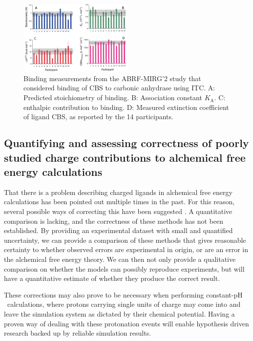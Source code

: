 \documentclass[10pt,final]{article}
\newcommand{\pH}{$\mathrm{pH}$\ }
\begin{document}
\begin{figure}[H]
	\centering
	\includegraphics[width=0.5\textwidth]{figures/cbs_ca_II.PNG}
	\caption{Binding measurements from the ABRF-MIRG'2 study that considered binding of CBS to carbonic anhydrase using ITC. A: Predicted stoichiometry of binding. B: Association constant $K_\mathrm{A}$. C: enthalpic contribution to binding. D: Measured extinction coefficient of ligand CBS, as reported by the 14 participants.\cite{Myszka2003a}}
	\label{figure:abrf-mirg2}
\end{figure}

\subsection*{Quantifying and assessing correctness of poorly studied charge contributions to alchemical free energy calculations}
That there is a problem describing charged ligands in alchemical free energy calculations has been pointed out multiple times in the past\cite{Rocklin2013b,Muddana2014a}. 
For this reason, several possible ways of correcting this have been suggested \cite{Reif2013a,Rocklin2013a}. A quantitative comparison is lacking, and the correctness of these methods has not been established. 
By providing an experimental dataset with small and quantified uncertainty, we can provide a comparison of these methods that gives reasonable certainty to whether observed errors are experimental in origin, or are an error in the alchemical free energy theory. 
We can then not only provide a qualitative comparison on whether the models can possibly reproduce experiments, but will have a quantitative estimate of whether they produce the correct result.

These corrections may also prove to be necessary when performing constant-\pH calculations, where protons carrying single units of charge may come into and leave the simulation system as dictated by their chemical potential. Having a proven way of dealing with these protonation events will enable hypothesis driven research backed up by reliable simulation results.
\end{document}
